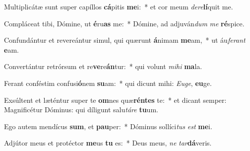 \item Multiplicátæ sunt super capíllos \textbf{cá}pitis \textbf{me}i:~* et cor meum \textit{de}\textit{re}\textbf{lí}quit me.
\item Compláceat tibi, Dómine, ut \textbf{é}ru\textbf{as} me:~* Dómine, ad adjuván\textit{dum} \textit{me} \textbf{ré}spice.
\item Confundántur et revereántur simul, qui quærunt \textbf{á}nimam \textbf{me}am,~* ut áu\textit{fe}\textit{rant} \textbf{e}am.
\item Convertántur retrórsum et re\textbf{ve}re\textbf{án}tur:~* qui volunt \textit{mi}\textit{hi} \textbf{ma}la.
\item Ferant conféstim confusi\textbf{ó}nem \textbf{su}am:~* qui dicunt mihi: \textit{Eu}\textit{ge}, \textbf{eu}ge.
\item Exsúltent et læténtur super te \textbf{om}nes quæ\textbf{rén}\textbf{tes} te:~* et dicant semper: Magnificétur Dóminus: qui díligunt salu\textit{tá}\textit{re} \textbf{tu}um.
\item Ego autem mendícus \textbf{sum}, et \textbf{pau}per:~* Dóminus sollíci\textit{tus} \textit{est} \textbf{me}i.
\item Adjútor meus et protéctor \textbf{me}us \textbf{tu} es:~* Deus meus, \textit{ne} \textit{tar}\textbf{dá}veris.

